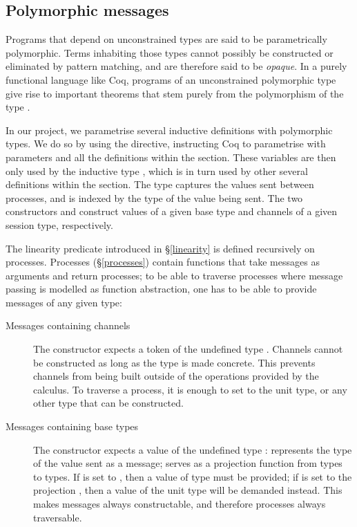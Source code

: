 \documentclass{mproj}
\begin{document}
\subsection{Polymorphic messages}\label{polymorphism}

Programs that depend on unconstrained types are said to be parametrically polymorphic. Terms inhabiting those types cannot possibly be constructed or eliminated by pattern matching, and are therefore said to be \emph{opaque}. In a purely functional language like Coq, programs of an unconstrained polymorphic type give rise to important theorems that stem purely from the polymorphism of the type \cite{Wadler1989}.

In our project, we parametrise several inductive definitions with polymorphic types. We do so by using the  directive, instructing Coq to parametrise with parameters  and  all the definitions within the section. These variables are then only used by the inductive type , which is in turn used by other several definitions within the section. The type  captures the values sent between processes, and is indexed by the type of the value being sent. The two constructors  and  construct values of a given base type and channels of a given session type, respectively.


The linearity predicate introduced in \S \ref{linearity} is defined recursively on processes. Processes (\S \ref{processes}) contain functions that take messages as arguments and return processes; to be able to traverse processes where message passing is modelled as function abstraction, one has to be able to provide messages of any given type:
\begin{description}
    \item [Messages containing channels] The  constructor expects a token of the undefined type . Channels cannot be constructed as long as the type  is made concrete. This prevents channels from being built outside of the operations provided by the calculus. To traverse a process, it is enough to set  to the unit type, or any other type that can be constructed.
        
    \item [Messages containing base types] The  constructor expects a value of the undefined type :  represents the type of the value sent as a message;  serves as a projection function from types to types. If  is set to , then a value of type  must be provided; if  is set to the projection , then a value of the unit type will be demanded instead. This makes messages always constructable, and therefore processes always traversable. 
\end{description}
\end{document}
